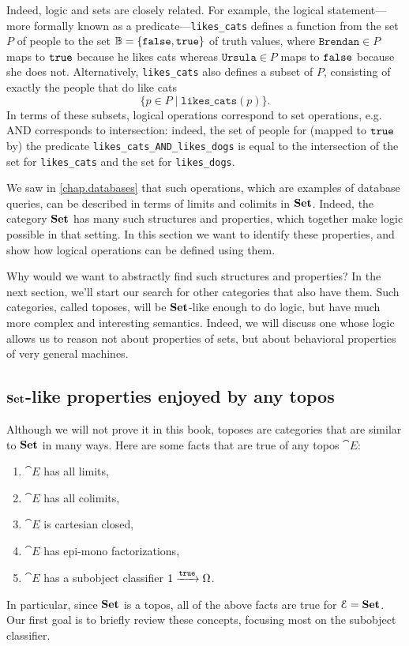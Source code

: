 \documentclass[7Sketches]{subfiles}
\begin{document}
Indeed, logic and sets are closely related. For example, the logical statement---more
formally known as a predicate---\texttt{likes\_cats} defines a function from the
set $P$ of people to the set $\mathbb{B}=\{\mathtt{false},\mathtt{true}\}$ of truth values, where
$\texttt{Brendan} \in P$ maps to $\mathtt{true}$ because he likes cats whereas
$\texttt{Ursula} \in P$ maps to $\mathtt{false}$ because she does not. Alternatively,
\texttt{likes\_cats} also defines a subset of $P$, consisting of exactly the
people that do like cats%
\[
\{p\in P\mid \texttt{likes\_cats}(p)\}.
\]
In terms of these subsets, logical operations correspond to set operations, e.g. AND corresponds to intersection: indeed, the set of people for
(mapped to $\mathtt{true}$ by) the predicate \texttt{likes\_cats\_AND\_likes\_dogs} is equal to the
intersection of the set for \texttt{likes\_cats} and the set for \texttt{likes\_dogs}.%
%

We saw in \cref{chap.databases} that such operations, which are examples of
database queries, can be described in terms of limits and colimits in $\mathbf{Set}$. Indeed, the
category $\mathbf{Set}$ has many such structures and properties, which together make logic possible in that setting. In this
section we want to identify these properties, and show how logical operations
can be defined using them. %
%
%

Why would we want to abstractly find such structures and properties? In the next section, we'll
start our search for other categories that also have them. Such
categories, called toposes, will be $\mathbf{Set}$-like enough to do logic, but
have much more complex and interesting semantics. Indeed, we will discuss one whose logic allows us to reason not about properties of sets, but about behavioral properties of very general machines.%

\subsection{$\mathbf{Set}$-like properties enjoyed by any topos}%
\label{subsec.set_like}%

Although we will not prove it in this book, toposes are categories that are similar to $\mathbf{Set}$ in many ways. Here are some facts that are true of any topos $\cat{E}$:
\begin{enumerate}%
\label{page.topos_properties}
	\item $\cat{E}$ has all limits,
	\item $\cat{E}$ has all colimits,
	\item $\cat{E}$ is cartesian closed,%
	\item $\cat{E}$ has epi-mono factorizations,%
%
%
	\item $\cat{E}$ has a subobject classifier $1\xrightarrow{\mathtt{true}}\Omega$.%
\end{enumerate}
In particular, since $\mathbf{Set}$ is a topos, all of the above facts are true for $\mathcal{E}=\mathbf{Set}$. Our first goal is to briefly review these concepts, focusing most on the subobject classifier.
\end{document}
